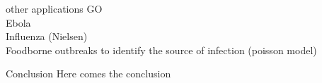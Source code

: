 \documentclass[table]{beamer}\usepackage[]{graphicx}\usepackage[]{color}
\begin{document}
% 
% 
% 


\begin{frame}[fragile]{other applications}
GO \\
Ebola \\

Influenza (Nielsen) \\
Foodborne outbreaks to identify the source of infection (poisson model)

\end{frame}


\begin{frame}[fragile]{Conclusion}
Here comes the conclusion
\end{frame}
\end{document}
